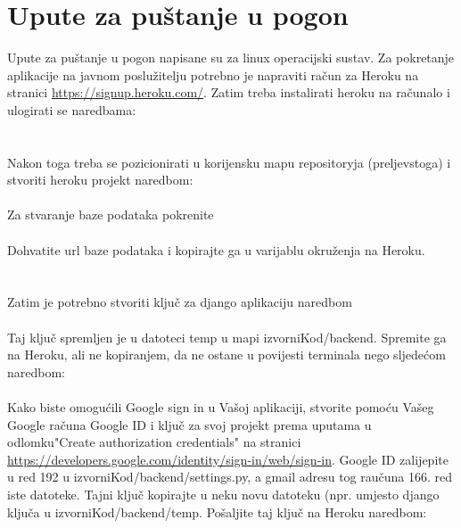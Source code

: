 	\section{Upute za puštanje u pogon}
		Upute za puštanje u pogon napisane su za linux operacijski sustav.
		Za pokretanje aplikacije na javnom poslužitelju potrebno je napraviti račun za Heroku na stranici \url{https://signup.heroku.com/}.
		Zatim treba instalirati heroku na računalo i ulogirati se naredbama: \\
		\\
		\\
		Nakon toga treba se pozicionirati u korijensku mapu repositoryja (preljevstoga) i stvoriti heroku projekt naredbom: \\
		 \\
		Za stvaranje baze podataka pokrenite \\
		 \\
		Dohvatite url baze podataka i kopirajte ga u varijablu okruženja na Heroku. \\
		 \\
		 \\
		Zatim je potrebno stvoriti ključ za django aplikaciju naredbom \\
		 \\
		Taj ključ spremljen je u datoteci temp u mapi izvorniKod/backend. Spremite ga na Heroku, ali ne kopiranjem, da ne ostane u povijesti terminala nego sljedećom naredbom: \\
		 \\
		Kako biste omogućili Google sign in u Vašoj aplikaciji, stvorite pomoću Vašeg Google računa
		Google ID i ključ za svoj projekt prema uputama u odlomku"Create authorization credentials" na stranici \url{https://developers.google.com/identity/sign-in/web/sign-in}. Google ID zalijepite u red 192 u izvorniKod/backend/settings.py, a gmail adresu tog raučuna 166. red iste datoteke. Tajni ključ kopirajte u neku novu datoteku (npr. umjesto django ključa u izvorniKod/backend/temp. Pošaljite taj ključ na Heroku naredbom: \\
		 \\
